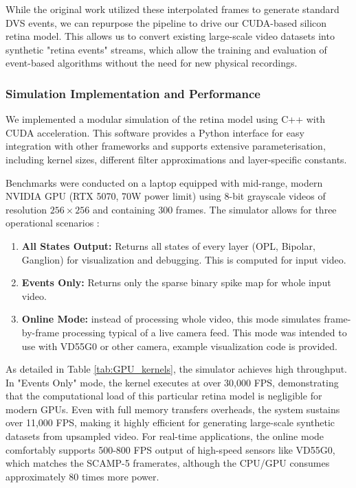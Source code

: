 \documentclass{article}
\begin{document}
While the original work utilized these interpolated frames to generate standard DVS events, we can repurpose the pipeline to drive our CUDA-based silicon retina model. This allows us to convert existing large-scale video datasets into synthetic "retina events" streams, which allow the training and evaluation of event-based algorithms without the need for new physical recordings.

\subsubsection*{Simulation Implementation and Performance}
We implemented a modular simulation of the retina model using C++ with CUDA acceleration. This software provides a Python interface for easy integration with other frameworks and supports extensive parameterisation, including kernel sizes, different filter approximations and layer-specific constants.

Benchmarks were conducted on a laptop equipped with mid-range, modern NVIDIA GPU (RTX 5070, 70W power limit) using 8-bit grayscale videos of resolution $256\times256$ and containing 300 frames. The simulator allows for three operational scenarios : 
\begin{enumerate}
    \item \textbf{All States Output:} Returns all states of every layer (OPL, Bipolar, Ganglion) for visualization and debugging. This is computed for input video.
    \item \textbf{Events Only:} Returns only the sparse binary spike map for whole input video.
    \item \textbf{Online Mode:} instead of processing whole video, this mode simulates frame-by-frame processing typical of a live camera feed. This mode was intended to use with VD55G0 or other camera, example visualization code is provided.
\end{enumerate}

As detailed in Table \ref{tab:GPU_kernels}, the simulator achieves high throughput. In "Events Only" mode, the kernel executes at over 30,000 FPS, demonstrating that the computational load of this particular retina model is negligible for modern GPUs. Even with full memory transfers overheads, the system sustains over 11,000 FPS, making it highly efficient for generating large-scale synthetic datasets from upsampled video. For real-time applications, the online mode comfortably supports 500-800 FPS output of high-speed sensors like VD55G0, which matches the SCAMP-5 framerates, although the CPU/GPU consumes approximately 80 times more power. 
\end{document}
